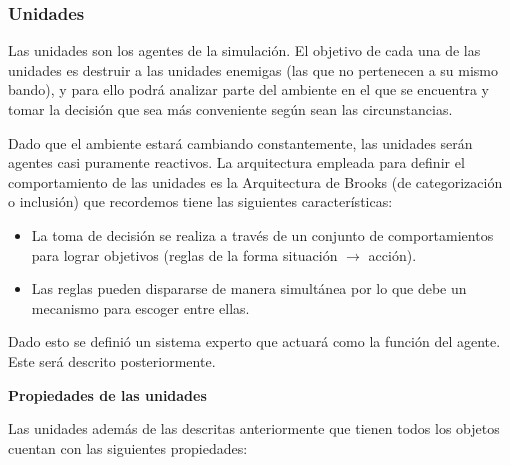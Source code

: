 \subsubsection{Unidades}

Las unidades son los agentes de la simulaci\'on. El objetivo de cada una de las unidades es destruir a las unidades enemigas (las que no pertenecen a su mismo bando), y para ello podr\'a analizar parte del ambiente en el que se encuentra y tomar la decisi\'on que sea m\'as conveniente seg\'un sean las circunstancias. 

Dado que el ambiente estar\'a cambiando constantemente, las unidades ser\'an agentes casi puramente reactivos. La arquitectura empleada para definir el comportamiento de las unidades es la Arquitectura de Brooks (de categorización o inclusión) que recordemos tiene las siguientes caracter\'isticas: 

\begin{itemize}
	\item La toma de decisión se realiza a través de un conjunto de comportamientos para lograr objetivos (reglas de la forma situación $\rightarrow$ acción).
	\item Las reglas pueden dispararse de manera simultánea por lo que debe un mecanismo para escoger entre ellas.	
\end{itemize}

Dado esto se defini\'o un sistema experto que actuar\'a como la funci\'on del agente. Este ser\'a descrito posteriormente.

\textbf{Propiedades de las unidades}

Las unidades adem\'as de las descritas anteriormente que tienen todos los objetos cuentan con las siguientes propiedades:

